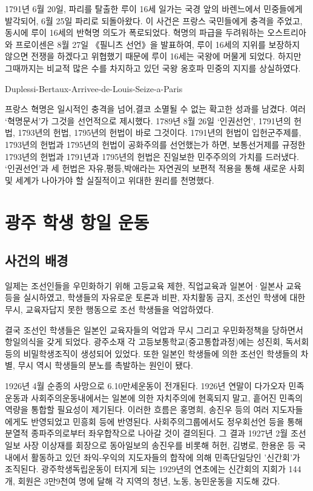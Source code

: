 1791년 6월 20일, 파리를 탈출한 루이 16세 일가는 국경 앞의 바렌느에서 민중들에게 발각되어, 6월 25일 파리로 되돌아왔다. 이 사건은 프랑스 국민들에게 충격을 주었고, 동시에 루이 16세의 반혁명 의도가 폭로되었다. 혁명의 파급을 두려워하는 오스트리아와 프로이센은 8월 27일 《필니츠 선언》을 발표하여, 루이 16세의 지위를 보장하지 않으면 전쟁을 하겠다고 위협했기 때문에 루이 16세는 국왕에 머물게 되었다. 하지만 그때까지는 비교적 많은 수를 차지하고 있던 국왕 옹호파 민중의 지지를 상실하였다.

\begin{fillimg}
{Duplessi-Bertaux-Arrivee-de-Louis-Seize-a-Paris}
\end{fillimg}

프랑스 혁명은 일시적인 충격을 넘어,결코 소멸될 수 없는 확고한 성과를 남겼다. 여러 `혁명문서'가 그것을 선언적으로 제시했다. 1789년 8월 26일 `인권선언', 1791년의 헌법, 1793년의 헌법, 1795년의 헌법이 바로 그것이다. 1791년의 헌법이 입헌군주제를, 1793년의 헌법과 1795년의 헌법이 공화주의를 선언했는가 하면, 보통선거제를 규정한 1793년의 헌법과 1791년과 1795년의 헌법은 진일보한 민주주의의 가치를 드러냈다. `인권선언'과 세 헌법은 자유,평등,박애라는 자연권의 보편적 적용을 통해 새로운 사회 및 세계가 나아가야 할 실질적이고 위대한 원리를 천명했다.


\chapter{광주 학생 항일 운동}
\section{사건의 배경}
일제는 조선인들을 우민화하기 위해 고등교육 제한, 직업교육과 일본어·일본사 교육 등을 실시하였고, 학생들의 자유로운 토론과 비판, 자치활동 금지, 조선인 학생에 대한 무시, 교육자답지 못한 행동으로 조선 학생들을 억압하였다.

결국 조선인 학생들은 일본인 교육자들의 억압과 무시 그리고 우민화정책을 당하면서 항일의식을 갖게 되었다. 광주소재 각 고등보통학교(중고통합과정)에는 성진회, 독서회 등의 비밀학생조직이 생성되어 있었다. 또한 일본인 학생들에 의한 조선인 학생들의 차별, 무시 역시 학생들의 분노를 촉발하는 원인이 됐다.

1926년 4월 순종의 사망으로 6.10만세운동이 전개된다. 1926년 연말이 다가오자 민족운동과 사회주의운동내에서는 일본에 의한 자치주의에 현혹되지 말고, 흩어진 민족의 역량을 통합할 필요성이 제기된다. 이러한 흐름은 홍명희, 송진우 등의 여러 지도자들에게도 반영되었고 민흥회 등에 반영된다. 사회주의그룹에서도 정우회선언 등을 통해 분열적 종파주의로부터 좌우합작으로 나아갈 것이 결의된다. 그 결과 1927년 2월 조선일보 사장 이상재를 회장으로 동아일보의 송진우를 비롯해 허헌, 김병로, 한용운 등 국내에서 활동하고 있던 좌익-우익의 지도자들의 합작에 의해 민족단일당인 '신간회'가 조직된다. 광주학생독립운동이 터지게 되는 1929년의 연초에는 신간회의 지회가 144개, 회원은 3만9천여 명에 달해 각 지역의 청년, 노동, 농민운동을 지도해 갔다.

